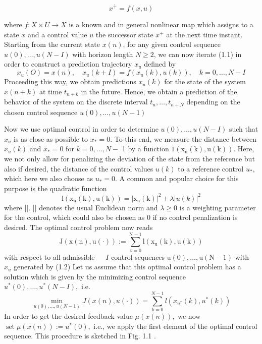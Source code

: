 \documentclass{UoNMCHA}
\numberwithin{equation}{section}
\begin{document}
\begin{equation}
	x^{\dotplus}=f(x,u)
\end{equation}

where $f: X \times U \rightarrow X$ is a known and in general nonlinear map which assigns to a state $x$ and a control
value $u$ the successor state $x^{+}$ at the next time instant. Starting
from the current state $x(n)$, for any given control sequence $u(0), \ldots, u(N-I)$ with horizon length
$N \geq 2$, we can now iterate (1.1) in order to construct a prediction trajectory $x_{u}$ defined by
$$
x_{u}(O)=x(n), \quad x_{u}(k+I)=f\left(x_{u}(k), u(k)\right), \quad k=0, \ldots, N-I
$$
Proceeding this way, we obtain predictions $x_{u}(k)$ for the state of the system $x(n+k)$ at time $t_{n+k}$ in
the future. Hence, we obtain a prediction of the behavior of the system on the discrete interval
$t_{n}, \ldots, t_{n+N}$ depending on the chosen control sequence $u(0), \ldots, u(N-1)$

Now we use optimal control in order to determine $u(0), \ldots, u(N-I)$ such that $x_{u}$ is as close as
possible to $x_{*}=0 .$ To this end, we measure the distance between $x_{u}(k)$ and $x_{*}=0$ for $k=0, \ldots, N-$ 1 by a function $1\left(\mathrm{x}_{\mathrm{u}}(\mathrm{k}), \mathrm{u}(\mathrm{k})\right)$. Here, we not only allow for penalizing the deviation of the state from
the reference but also if desired, the distance of the control values $u(k)$ to a reference control $u_{*}$, which
here we also choose as $u_{*}=0 .$ A common and popular choice for this purpose is the quadratic function
$$
\mathrm{l}\left(\mathrm{x}_{\mathrm{u}}(\mathrm{k}), \mathrm{u}(\mathrm{k})\right)=\left|\mathrm{x}_{\mathrm{u}}(\mathrm{k})\right|^{2}+\lambda|u(k)|^{2}
$$
where ||. || denotes the usual Euclidean norm and $\lambda \geq 0$ is a weighting parameter for the control, which
could also be chosen as 0 if no control penalization is desired.
The optimal control problem now reads
$$
\mathrm{J}(\mathrm{x}(\mathrm{n}), \mathrm{u}(\cdot)):=\sum_{\mathrm{k}=0}^{\mathrm{N}-1} \mathrm{l}\left(\mathrm{x}_{\mathrm{u}}(\mathrm{k}), \mathrm{u}(\mathrm{k})\right)
$$
with respect to all admissible $\ \quad I$ control sequences $\mathrm{u}(0), \ldots, \mathrm{u}(\mathrm{N}-1)$ with $x_{u}$ generated by (1.2)
Let us assume that this optimal control problem has a solution which is given by the minimizing control
sequence $u^{*}(0), \ldots, u^{*}(N-I),$ i.e.
$$
\min _{u(0), \ldots, u(N-1)} J(x(n), u(\cdot))=\sum_{k=0}^{N-1} l\left(x_{u^{*}}(k), u^{*}(k)\right)
$$
In order to get the desired feedback value $\mu(x(n)),$ we now $\operatorname{set} \mu(x(n)):=u^{*}(0),$
i.e., we apply the first element of the optimal control sequence. This procedure is sketched in Fig. 1.1 .
\end{document}
